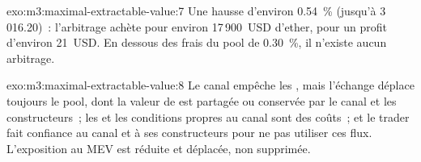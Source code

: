 \begin{solution}{exo:m3:maximal-extractable-value:7}
Une hausse d'environ 0.54~\% (jusqu'à 3\,016.20)~: l'arbitrage achète pour environ 17\,900~USD d'ether, pour un profit d'environ 21~USD. En dessous des
frais du pool de 0.30~\%, il n'existe aucun arbitrage.
\end{solution}

\begin{solution}{exo:m3:maximal-extractable-value:8}
Le canal empêche les , mais l'échange déplace toujours le pool, dont la valeur de  est partagée ou conservée par le canal et
les constructeurs~; les  et les conditions propres au canal sont des coûts~; et le trader fait confiance au canal et à ses constructeurs pour ne pas utiliser
ces flux. L'exposition au MEV est réduite et déplacée, non supprimée.
\end{solution}


